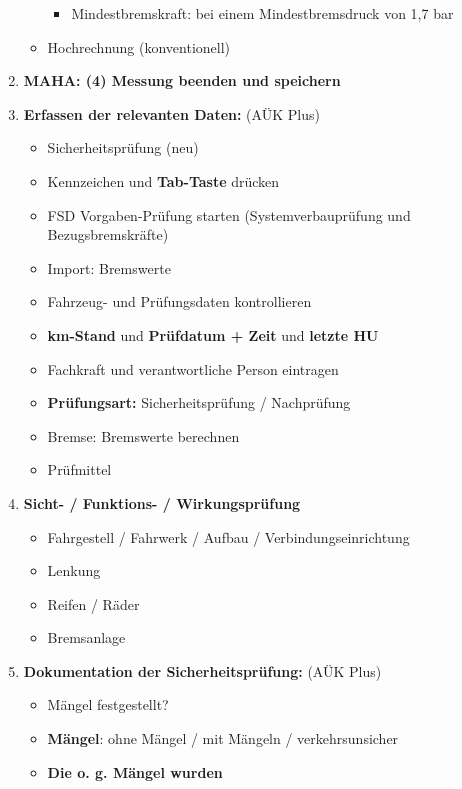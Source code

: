 \documentclass{vorlage-design-main}
\begin{document}
\begin{enumerate}
\begin{itemize}
    \begin{itemize}
    
    \item
      Mindestbremskraft: bei einem Mindestbremsdruck von 1,7 bar
    \end{itemize}
  \item
    Hochrechnung (konventionell)
  \end{itemize}
\item
  \textbf{MAHA: (4) Messung beenden und speichern}
\item
  \textbf{Erfassen der relevanten Daten:} (AÜK Plus)

  \begin{itemize}
  
  \item
    Sicherheitsprüfung (neu)
  \item
    Kennzeichen und \textbf{Tab-Taste} drücken
  \item
    FSD Vorgaben-Prüfung starten (Systemverbauprüfung und
    Bezugsbremskräfte)
  \item
    Import: Bremswerte
  \item
    Fahrzeug- und Prüfungsdaten kontrollieren
  \item
    \textbf{km-Stand} und \textbf{Prüfdatum + Zeit} und \textbf{letzte
    HU}
  \item
    Fachkraft und verantwortliche Person eintragen
  \item
    \textbf{Prüfungsart:} Sicherheitsprüfung / Nachprüfung
  \item
    Bremse: Bremswerte berechnen
  \item
    Prüfmittel
  \end{itemize}
\item
  \textbf{Sicht- / Funktions- / Wirkungsprüfung}

  \begin{itemize}
  
  \item
    Fahrgestell / Fahrwerk / Aufbau / Verbindungseinrichtung
  \item
    Lenkung
  \item
    Reifen / Räder
  \item
    Bremsanlage
  \end{itemize}
\item
  \textbf{Dokumentation der Sicherheitsprüfung:} (AÜK Plus)

  \begin{itemize}
  
  \item
    Mängel festgestellt?
  \item
    \textbf{Mängel}: ohne Mängel / mit Mängeln / verkehrsunsicher
  \item
    \textbf{Die o. g. Mängel wurden}


\end{itemize}
\end{enumerate}
\end{document}
